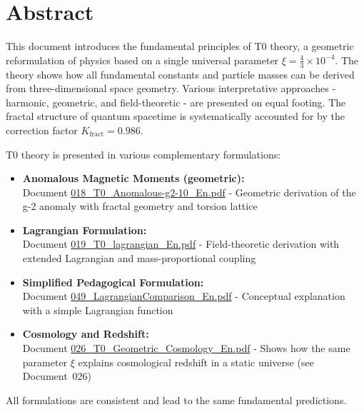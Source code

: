 \section*{Abstract}
		This document introduces the fundamental principles of T0 theory, a geometric reformulation of physics based on a single universal parameter $\xi = \frac{4}{3} \times 10^{-4}$. The theory shows how all fundamental constants and particle masses can be derived from three-dimensional space geometry. Various interpretative approaches - harmonic, geometric, and field-theoretic - are presented on equal footing. The fractal structure of quantum spacetime is systematically accounted for by the correction factor $K_{\text{fract}} = 0.986$.

	
	\begin{tcolorbox}[colback=blue!10!white, colframe=blue!75!black, title=References to Complementary T0 Formulations]
		T0 theory is presented in various complementary formulations:
		
		\begin{itemize}
			\item \textbf{Anomalous Magnetic Moments (geometric):} \\
			Document \href{https://github.com/jpascher/T0-Time-Mass-Duality/blob/main/2/pdf/018_T0_Anomalous-g2-10_En.pdf}{018\_T0\_Anomalous-g2-10\_En.pdf} - 
			Geometric derivation of the g-2 anomaly with fractal geometry and torsion lattice
			
			\item \textbf{Lagrangian Formulation:} \\
			Document \href{https://github.com/jpascher/T0-Time-Mass-Duality/blob/main/2/pdf/019_T0_lagrangian_En.pdf}{019\_T0\_lagrangian\_En.pdf} - 
			Field-theoretic derivation with extended Lagrangian and mass-proportional coupling
			
			\item \textbf{Simplified Pedagogical Formulation:} \\
			Document \href{https://github.com/jpascher/T0-Time-Mass-Duality/blob/main/2/pdf/049_LagrangianComparison_En.pdf}{049\_LagrangianComparison\_En.pdf} - 
			Conceptual explanation with a simple Lagrangian function
			
			\item \textbf{Cosmology and Redshift:} \\
			Document \href{https://github.com/jpascher/T0-Time-Mass-Duality/blob/main/2/pdf/026_T0_Geometric_Cosmology_En.pdf}{026\_T0\_Geometric\_Cosmology\_En.pdf} - 
			Shows how the same parameter $\xi$ explains cosmological redshift in a static universe (see Document~026)
		\end{itemize}
		
		All formulations are consistent and lead to the same fundamental predictions.
	\end{tcolorbox}
	
